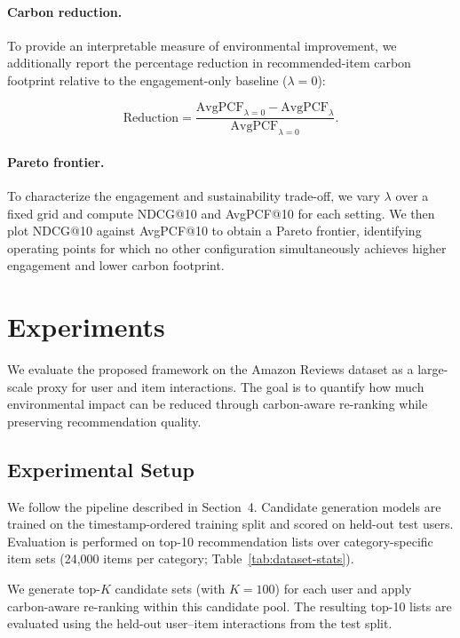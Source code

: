 \documentclass[11pt]{article}
\begin{document}
\paragraph{Carbon reduction.}
To provide an interpretable measure of environmental improvement, we additionally report
the percentage reduction in recommended-item carbon footprint relative to the
engagement-only baseline ($\lambda=0$):

\begin{equation}
\mathrm{Reduction} =
\frac{\mathrm{AvgPCF}_{\lambda=0} - \mathrm{AvgPCF}_{\lambda}}
{\mathrm{AvgPCF}_{\lambda=0}}.
\end{equation}

\paragraph{Pareto frontier.}
To characterize the engagement and sustainability trade-off, we vary $\lambda$ over a fixed
grid and compute NDCG@10 and AvgPCF@10 for each setting. We then plot NDCG@10
against AvgPCF@10 to obtain a Pareto frontier, identifying operating points for which no
other configuration simultaneously achieves higher engagement and lower carbon footprint.




\section{Experiments}\label{sec:experiments}
We evaluate the proposed framework on the Amazon Reviews dataset as a large-scale proxy for
user and item interactions. The goal is to quantify how much environmental impact can be
reduced through carbon-aware re-ranking while preserving recommendation quality.

\subsection{Experimental Setup}

We follow the pipeline described in Section~4. Candidate generation models are trained on
the timestamp-ordered training split and scored on held-out test users. Evaluation is
performed on top-10 recommendation lists over category-specific item sets
(24{,}000 items per category; Table~\ref{tab:dataset-stats}).

We generate top-$K$ candidate sets (with $K=100$) for each user and apply carbon-aware
re-ranking within this candidate pool. The resulting top-10 lists are evaluated using the
held-out user--item interactions from the test split.
\end{document}
